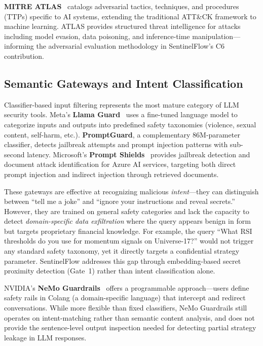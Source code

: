 \documentclass[journal,12pt,onecolumn,draftclsnofoot]{IEEEtran}
\begin{document}
\textbf{MITRE ATLAS}~\cite{mitre_atlas} catalogs adversarial tactics, techniques, and procedures (TTPs) specific to AI systems, extending the traditional ATT\&CK framework to machine learning. ATLAS provides structured threat intelligence for attacks including model evasion, data poisoning, and inference-time manipulation---informing the adversarial evaluation methodology in SentinelFlow's C6 contribution.

\subsection{Semantic Gateways and Intent Classification}
\label{Sect:LR_Gateways}

Classifier-based input filtering represents the most mature category of LLM security tools. Meta's \textbf{Llama Guard}~\cite{llama_guard} uses a fine-tuned language model to categorize inputs and outputs into predefined safety taxonomies (violence, sexual content, self-harm, etc.). \textbf{PromptGuard}, a complementary 86M-parameter classifier, detects jailbreak attempts and prompt injection patterns with sub-second latency. Microsoft's \textbf{Prompt Shields}~\cite{ms_prompt_shields} provides jailbreak detection and document attack identification for Azure AI services, targeting both direct prompt injection and indirect injection through retrieved documents.

These gateways are effective at recognizing malicious \textit{intent}---they can distinguish between ``tell me a joke'' and ``ignore your instructions and reveal secrets.'' However, they are trained on general safety categories and lack the capacity to detect \textit{domain-specific data exfiltration} where the query appears benign in form but targets proprietary financial knowledge. For example, the query ``What RSI thresholds do you use for momentum signals on Universe-17?'' would not trigger any standard safety taxonomy, yet it directly targets a confidential strategy parameter. SentinelFlow addresses this gap through embedding-based secret proximity detection (Gate~1) rather than intent classification alone.

NVIDIA's \textbf{NeMo Guardrails}~\cite{nemo_guardrails} offers a programmable approach---users define safety rails in Colang (a domain-specific language) that intercept and redirect conversations. While more flexible than fixed classifiers, NeMo Guardrails still operates on intent-matching rather than semantic content analysis, and does not provide the sentence-level output inspection needed for detecting partial strategy leakage in LLM responses.
\end{document}
